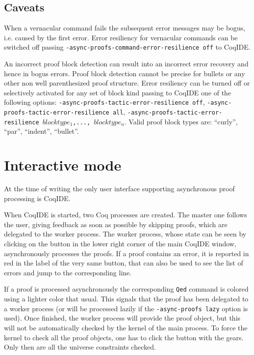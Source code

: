 \subsection{Caveats}

When a vernacular command fails the subsequent error messages may be bogus, i.e. caused by
the first error.  Error resiliency for vernacular commands can be switched off passing
\texttt{-async-proofs-command-error-resilience off} to CoqIDE.

An incorrect proof block detection can result into an incorrect error recovery and
hence in bogus errors.  Proof block detection cannot be precise for bullets or
any other non well parenthesized proof structure.  Error resiliency can be
turned off or selectively activated for any set of block kind passing to
CoqIDE one of the following options:
\texttt{-async-proofs-tactic-error-resilience off},
\texttt{-async-proofs-tactic-error-resilience all},
\texttt{-async-proofs-tactic-error-resilience $blocktype_1$,..., $blocktype_n$}.
Valid proof block types are: ``curly'', ``par'', ``indent'', ``bullet''.

\section{Interactive mode}

At the time of writing the only user interface supporting asynchronous proof
processing is CoqIDE.

When CoqIDE is started, two Coq processes are created.  The master one follows
the user, giving feedback as soon as possible by skipping proofs, which are
delegated to the worker process.  The worker process, whose state can be seen
by clicking on the button in the lower right corner of the main CoqIDE window,
asynchronously processes the proofs.  If a proof contains an error, it is
reported in red in the label of the very same button, that can also be used to
see the list of errors and jump to the corresponding line.

If a proof is processed asynchronously the corresponding \texttt{Qed} command
is colored using a lighter color that usual.  This signals that
the proof has been delegated to a worker process (or will be processed
lazily if the \texttt{-async-proofs lazy} option is used). Once finished, the
worker process will provide the proof object, but this will not be
automatically checked by the kernel of the main process. To force
the kernel to check all the proof objects, one has to click the button
with the gears. Only then are all the universe constraints checked.


